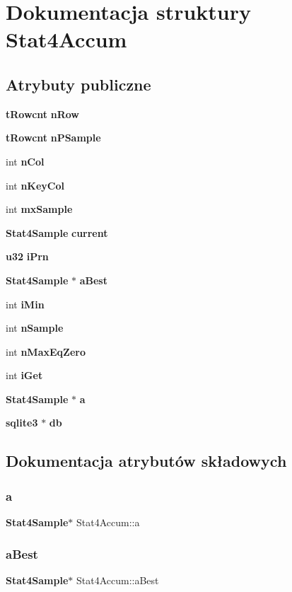 \section{Dokumentacja struktury Stat4\+Accum}
\label{struct_stat4_accum}
\subsection*{Atrybuty publiczne}
\begin{DoxyCompactItemize}
\item 
\textbf{ t\+Rowcnt} \textbf{ n\+Row}
\item 
\textbf{ t\+Rowcnt} \textbf{ n\+P\+Sample}
\item 
int \textbf{ n\+Col}
\item 
int \textbf{ n\+Key\+Col}
\item 
int \textbf{ mx\+Sample}
\item 
\textbf{ Stat4\+Sample} \textbf{ current}
\item 
\textbf{ u32} \textbf{ i\+Prn}
\item 
\textbf{ Stat4\+Sample} $\ast$ \textbf{ a\+Best}
\item 
int \textbf{ i\+Min}
\item 
int \textbf{ n\+Sample}
\item 
int \textbf{ n\+Max\+Eq\+Zero}
\item 
int \textbf{ i\+Get}
\item 
\textbf{ Stat4\+Sample} $\ast$ \textbf{ a}
\item 
\textbf{ sqlite3} $\ast$ \textbf{ db}
\end{DoxyCompactItemize}


\subsection{Dokumentacja atrybutów składowych}
\mbox{\label{struct_stat4_accum_a921a2a1d92fe8113626bde517d004278}} 
\subsubsection{a}
{\footnotesize\ttfamily \textbf{ Stat4\+Sample}$\ast$ Stat4\+Accum\+::a}

\mbox{\label{struct_stat4_accum_a634729ee0061b7243e770b6281d9a7a4}} 
\subsubsection{aBest}
{\footnotesize\ttfamily \textbf{ Stat4\+Sample}$\ast$ Stat4\+Accum\+::a\+Best}

